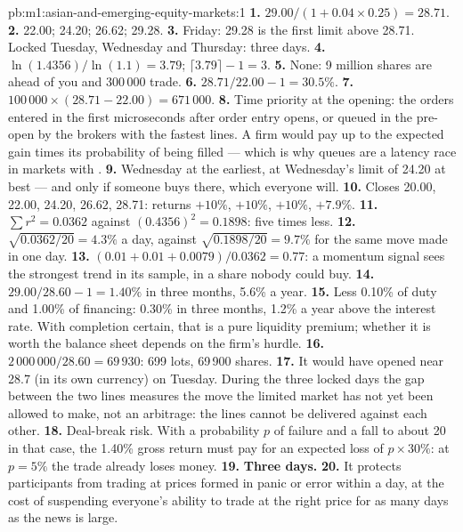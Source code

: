\begin{solution}{pb:m1:asian-and-emerging-equity-markets:1}
\textbf{1.} $29.00/(1 + 0.04\times0.25) = 28.71$.
\textbf{2.} 22.00; 24.20; 26.62; 29.28.
\textbf{3.} Friday: 29.28 is the first limit above 28.71. Locked Tuesday,
Wednesday and Thursday: three days.
\textbf{4.} $\ln(1.4356)/\ln(1.1) = 3.79$; $\lceil3.79\rceil - 1 = 3$.
\textbf{5.} None: 9 million shares are ahead of you and 300\,000 trade.
\textbf{6.} $28.71/22.00 - 1 = 30.5\%$.
\textbf{7.} $100\,000 \times (28.71 - 22.00) = 671\,000$.
\textbf{8.} Time priority at the opening: the orders entered in the first
microseconds after order entry opens, or queued in the pre-open by the
brokers with the fastest lines. A firm would pay up to the expected gain
times its probability of being filled --- which is why  queues are a
latency race in markets with .
\textbf{9.} Wednesday at the earliest, at Wednesday's limit of 24.20 at best
--- and only if someone buys there, which everyone will.
\textbf{10.} Closes 20.00, 22.00, 24.20, 26.62, 28.71: returns $+10\%$,
$+10\%$, $+10\%$, $+7.9\%$.
\textbf{11.} $\sum r^2 = 0.0362$ against $(0.4356)^2 = 0.1898$: five times
less.
\textbf{12.} $\sqrt{0.0362/20} = 4.3\%$ a day, against $\sqrt{0.1898/20} =
9.7\%$ for the same move made in one day.
\textbf{13.} $(0.01 + 0.01 + 0.0079)/0.0362 = 0.77$: a momentum signal sees
the strongest trend in its sample, in a share nobody could buy.
\textbf{14.} $29.00/28.60 - 1 = 1.40\%$ in three months, 5.6\% a year.
\textbf{15.} Less 0.10\% of duty and 1.00\% of financing: 0.30\% in three
months, 1.2\% a year above the interest rate. With completion certain, that
is a pure liquidity premium; whether it is worth the balance sheet depends on
the firm's hurdle.
\textbf{16.} $2\,000\,000/28.60 = 69\,930$: 699 lots, 69\,900 shares.
\textbf{17.} It would have opened near 28.7 (in its own currency) on Tuesday.
During the three locked days the gap between the two lines measures the
move the limited market has not yet been allowed to make, not an arbitrage:
the lines cannot be delivered against each other.
\textbf{18.} Deal-break risk. With a probability $p$ of failure and a fall to
about 20 in that case, the 1.40\% gross return must pay for an expected loss
of $p \times 30\%$: at $p = 5\%$ the trade already loses money.
\textbf{19.} \textbf{Three days.}
\textbf{20.} It protects participants from trading at prices formed in panic
or error within a day, at the cost of suspending everyone's ability to trade
at the right price for as many days as the news is large.
\end{solution}

